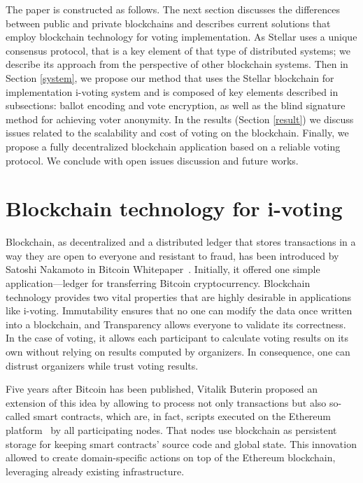\documentclass[applsci,article,submit,moreauthors,pdftex]{Definitions/mdpi}
\begin{document}
The paper is constructed as follows. The next section discusses the differences between public and private blockchains and describes current solutions that employ blockchain technology for voting implementation.
As Stellar uses a unique consensus protocol, that is a key element of that type of distributed systems; we describe its approach from the perspective of other blockchain systems.  
Then in Section \ref{system}, we propose our method that uses the Stellar blockchain for implementation i-voting system and is composed of key elements described in subsections: ballot encoding and vote encryption, as well as the blind signature method for achieving voter anonymity. 
In the results (Section \ref{result}) we discuss issues related to the scalability and cost of voting on the blockchain. Finally, we propose a fully decentralized blockchain application based on a reliable voting protocol. We conclude with open issues discussion and future works. 


\section{Blockchain technology for i-voting}%

Blockchain, as decentralized and a distributed ledger that stores
transactions in a way they are open to everyone and resistant to fraud, has been introduced by Satoshi Nakamoto in Bitcoin Whitepaper~\cite{nakamoto2008bitcoin}. Initially, it offered one simple application––ledger for transferring Bitcoin cryptocurrency. 
Blockchain technology provides two vital properties that are highly desirable in applications like i-voting. Immutability ensures that no one can modify the data once written into a blockchain, and Transparency allows everyone to validate its correctness. In the case of voting, it allows each participant to calculate voting results on its own without relying on results computed by organizers. 
In consequence, one can distrust organizers while trust voting results. 

Five years after Bitcoin has been published, Vitalik Buterin proposed an extension of this idea by allowing to process not only transactions but also so-called smart contracts, which are, in fact, scripts executed on the Ethereum platform~\cite{buterin2013ethereum} by all participating nodes. That nodes use blockchain as persistent storage for keeping smart contracts' source code and global state. This innovation allowed to create domain-specific actions on top of the Ethereum blockchain, leveraging already existing infrastructure.
\end{document}
